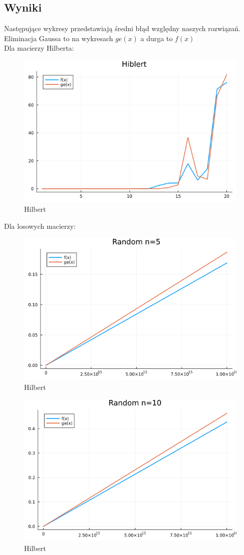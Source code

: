 \documentclass{article}
\begin{document}
    \subsection{Wyniki}
    Następujące wykresy przedstawiają średni błąd względny naszych rozwiązań. Eliminacja Gaussa to na wykresach $ge(x)$ a durga to $f(x)$\\
    Dla macierzy Hilberta: 
    \begin{figure}[H]
        \centering
        \includegraphics[width=0.75\linewidth]{3.1.png}
        \caption{Hilbert}
        \label{fig:enter-label}
    \end{figure}
    Dla losowych macierzy: 
    \begin{figure}[H]
        \centering
        \includegraphics[width=0.75\linewidth]{3.2.png}
        \caption{Hilbert}
        \label{fig:enter-label}
    \end{figure}
    \begin{figure}[H]
        \centering
        \includegraphics[width=0.75\linewidth]{3.3.png}
        \caption{Hilbert}
        \label{fig:enter-label}
    \end{figure}
\end{document}
